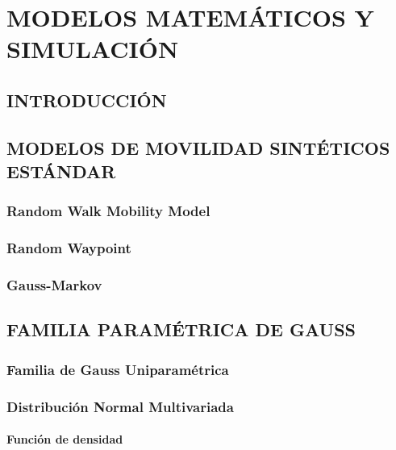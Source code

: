 \chapter{MODELOS MATEMÁTICOS Y SIMULACIÓN}

\renewcommand{\thefootnote}{\arabic{footnote}}
\renewcommand{\theequation}{\arabic{chapter}-\arabic{equation}}
\renewcommand{\thefigure}{\arabic{chapter}.\arabic{figure}}
\renewcommand{\figurename}{Figura}
\renewcommand{\tablename}{\textbf{Tabla}}
\renewcommand{\thetable}{\textbf{\arabic{chapter}-\arabic{table}}}
\providecommand{\abs}[1]{\lvert#1\rvert}
\providecommand{\norm}[1]{\lVert#1\rVert}



\section{INTRODUCCIÓN}\label{sec:intro}
\section{MODELOS DE MOVILIDAD SINTÉTICOS ESTÁNDAR}\label{sec:movilityModels}
\subsection{Random Walk Mobility Model}
\subsection{Random Waypoint}
\subsection{Gauss-Markov}

\section{FAMILIA PARAMÉTRICA DE GAUSS}\label{sec:gaussParamFam}
\subsection{Familia de Gauss Uniparamétrica}
\subsection{Distribución Normal Multivariada}
\subsubsection{Función de densidad}
